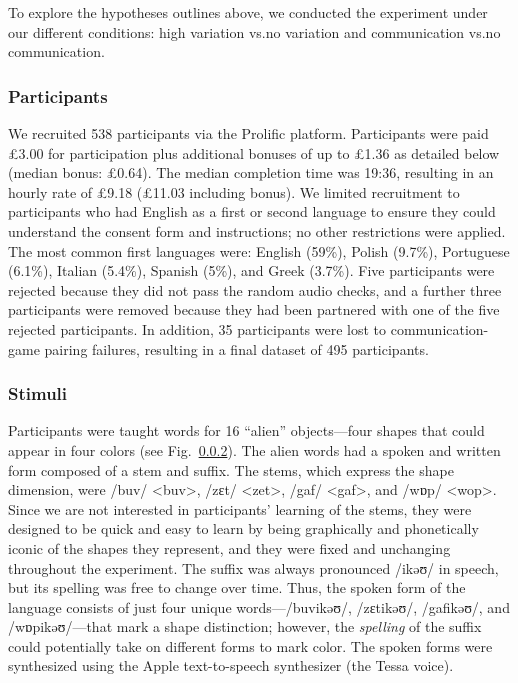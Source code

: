 \documentclass[doc,biblatex]{apa7}
\begin{document}
To explore the hypotheses outlines above, we conducted the experiment under our different conditions: high variation vs.\@ no variation and communication vs.\@ no communication.

\subsubsection{Participants}

We recruited 538 participants via the Prolific platform. Participants were paid £3.00 for participation plus additional bonuses of up to £1.36 as detailed below (median bonus: £0.64). The median completion time was 19:36, resulting in an hourly rate of £9.18 (£11.03 including bonus). We limited recruitment to participants who had English as a first or second language to ensure they could understand the consent form and instructions; no other restrictions were applied. The most common first languages were: English (59\%), Polish (9.7\%), Portuguese (6.1\%), Italian (5.4\%), Spanish (5\%), and Greek (3.7\%). Five participants were rejected because they did not pass the random audio checks, and a further three participants were removed because they had been partnered with one of the five rejected participants. In addition, 35 participants were lost to communication-game pairing failures, resulting in a final dataset of 495 participants.

\subsubsection{Stimuli}

Participants were taught words for 16 ``alien'' objects---four shapes that could appear in four colors (see Fig.~\ref{}). The alien words had a spoken and written form composed of a stem and suffix. The stems, which express the shape dimension, were /buv/ <buv>, /zɛt/ <zet>, /gaf/ <gaf>, and /wɒp/ <wop>. Since we are not interested in participants' learning of the stems, they were designed to be quick and easy to learn by being graphically and phonetically iconic of the shapes they represent, and they were fixed and unchanging throughout the experiment. The suffix was always pronounced /ikəʊ/ in speech, but its spelling was free to change over time. Thus, the spoken form of the language consists of just four unique words---/buvikəʊ/, /zɛtikəʊ/, /gafikəʊ/, and /wɒpikəʊ/---that mark a shape distinction; however, the \textit{spelling} of the suffix could potentially take on different forms to mark color. The spoken forms were synthesized using the Apple text-to-speech synthesizer (the Tessa voice).
\end{document}

